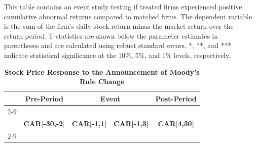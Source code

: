 \documentclass[a4paper, 12pt]{article}
\begin{document}
\begin{landscape}
\pagestyle{empty}
\begin{table}[htbp]
\caption{\textbf{Stock Price Response to the Announcement of Moody's Rule Change}
} \label{table_car}
\begin{singlespace}
\begin{small}

\noindent This table contains an event study testing if treated firms experienced positive cumulative abnormal returns compared to matched firms. The dependent variable is the sum of the firm's daily stock return minus the market return over the return period. T-statistics are shown below the parameter estimates in parentheses and are calculated using robust standard errors. *, **, and *** indicate statistical significance at the $10\%$, $5\%$, and $1\%$ levels, respectively.

\end{small}
\end{singlespace}
\vspace{3mm}
\small
  \centering

\begin{tabular}{lcccccccc}
\\
    \toprule
    &
        \multicolumn{2}{c}{\textbf{Pre-Period}} &
      \multicolumn{4}{c}{\textbf{Event}} &
        \multicolumn{2}{c}{\textbf{Post-Period}}
        \\
                  \cline{2-9}
        \\
    &
    \multicolumn{2}{c}{\textbf{CAR[-30,-2]}} &
      \multicolumn{2}{c}{\textbf{CAR[-1,1]}} &
        \multicolumn{2}{c}{\textbf{CAR[-1,3]}} &
           \multicolumn{2}{c}{\textbf{CAR[4,30]}}
      \\
          \cline{2-9}

    \bottomrule
    \end{tabular}


\end{table}
\end{landscape}
\clearpage
\end{document}
